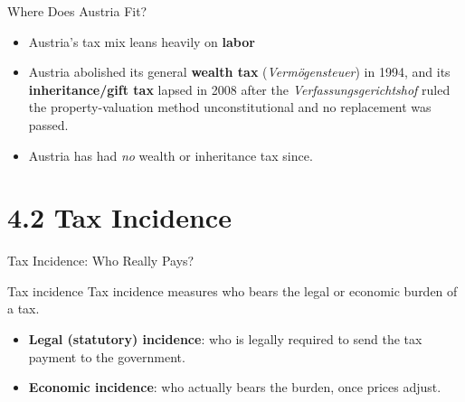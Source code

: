 \documentclass[11pt,aspectratio=169]{beamer}
\begin{document}
\begin{frame}{Where Does Austria Fit?}
  \begin{itemize}
    \item  Austria's tax mix leans heavily on \textbf{labor}
    \item  Austria abolished its general \textbf{wealth tax} (\emph{Vermögensteuer}) in 1994, and its \textbf{inheritance/gift tax} lapsed in 2008 after the \emph{Verfassungsgerichtshof} ruled the property-valuation method unconstitutional and no replacement was passed.
    \item Austria has had \emph{no} wealth or inheritance tax since.
  \end{itemize}

\end{frame}

\section{4.2 Tax Incidence}

\begin{frame}{Tax Incidence: Who Really Pays?}
  \begin{block}{Tax incidence}
   Tax incidence measures who bears the legal or economic burden of a tax.
  \end{block}
  \vspace{0.3em}
  \begin{itemize}
    \item \textbf{Legal (statutory) incidence}: who is legally required to send the tax payment to the government.
    \item \textbf{Economic incidence}: who actually bears the burden, once prices adjust.
  \end{itemize}


\end{frame}
\end{document}
